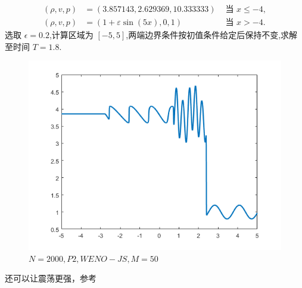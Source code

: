 \documentclass{book}
\begin{document}
\begin{example}
    \begin{equation}
        \begin{aligned}
            (\rho, v, p) & =(3.857143,2.629369,10.333333)   & \text { 当 } x \leq-4, \\
            (\rho, v, p) & =(1+\varepsilon \sin (5 x), 0,1) & \text { 当 } x>-4 .
        \end{aligned}
    \end{equation}
    选取 $\epsilon = 0.2$,计算区域为 $[-5,5]$,两端边界条件按初值条件给定后保持不变,求解至时间 $T=1.8$.
    \begin{figure}[htp]
        \centering
        \label{fig:shu_Osher}
        \includegraphics[width=0.7\linewidth]{fig/Shu_Osher.png}
        \caption{$N=2000,P2,WENO-JS,M=50$}
    \end{figure}
    还可以让震荡更强，参考 \cite{2021Youngsoo}
\end{example}
\end{document}
